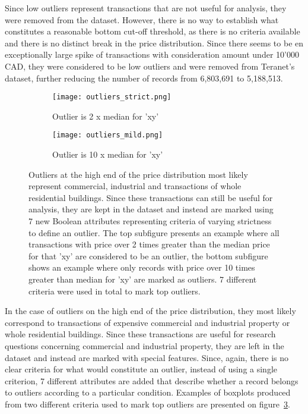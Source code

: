 Since low outliers represent transactions that are not useful for analysis, they were removed from the dataset.
However, there is no way to establish what constitutes a reasonable bottom cut-off threshold, as there is no criteria available and there is no distinct break in the price distribution.
Since there seems to be en exceptionally large spike of transactions with consideration amount under 10'000 CAD, they were considered to be low outliers and were removed from Teranet's dataset, further reducing the number of records from 6,803,691 to 5,188,513.

\begin{figure}[ht]
    \centering
    \begin{subfigure}{\linewidth}
        \centering
        \texttt{[image: outliers\_strict.png]}
        \label{fig:top_outliers_mild}
        \caption{Outlier is 2 x median for 'xy'}
    \end{subfigure}

    \begin{subfigure}{\linewidth}
        \centering
        \texttt{[image: outliers\_mild.png]}
        \label{fig:top_outliers_strict}
        \caption{Outlier is 10 x median for 'xy'}
    \end{subfigure}
    \caption{Outliers at the high end of the price distribution most likely represent commercial, industrial and transactions of whole residential buildings.
    Since these transactions can still be useful for analysis, they are kept in the dataset and instead are marked using 7 new Boolean attributes representing criteria of varying strictness to define an outlier.
    The top subfigure presents an example where all transactions with price over 2 times greater than the median price for that 'xy' are considered to be an outlier, the bottom subfigure shows an example where only records with price over 10 times greater than median for 'xy' are marked as outliers.
    7 different criteria were used in total to mark top outliers.}
    \label{fig:top_outliers}
\end{figure}

In the case of outliers on the high end of the price distribution, they most likely correspond to transactions of expensive commercial and industrial property or whole residential buildings.
Since these transactions are useful for research questions concerning commercial and industrial property, they are left in the dataset and instead are marked with special features.
Since, again, there is no clear criteria for what would constitute an outlier, instead of using a single criterion, 7 different attributes are added that describe whether a record belongs to outliers according to a particular condition.
Examples of boxplots produced from two different criteria used to mark top outliers are presented on figure~\ref{fig:top_outliers}.


